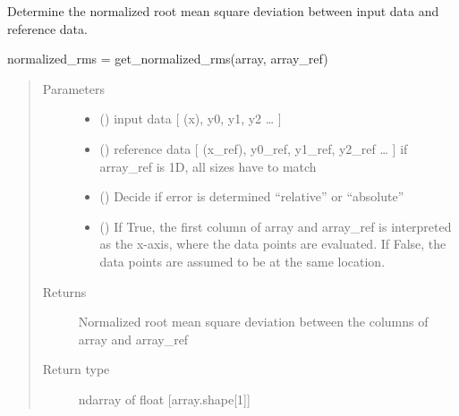 \documentclass[letterpaper,10pt,english,openany,oneside]{sphinxmanual}
\begin{document}
\begin{fulllineitems}
\label{\detokenize{pygpc:pygpc.misc.nrmsd}}
Determine the normalized root mean square deviation between input data and reference data.

normalized\_rms = get\_normalized\_rms(array, array\_ref)
\begin{quote}\begin{description}
\item[{Parameters}] \leavevmode\begin{itemize}
\item {} 
 () \textendash{} input data {[} (x), y0, y1, y2 … {]}

\item {} 
 () \textendash{} reference data {[} (x\_ref), y0\_ref, y1\_ref, y2\_ref … {]}
if array\_ref is 1D, all sizes have to match

\item {} 
 (\sphinxstyleliteralemphasis{\sphinxupquote{, }}\sphinxstyleliteralemphasis{\sphinxupquote{, }}) \textendash{} Decide if error is determined “relative” or “absolute”

\item {} 
 (\sphinxstyleliteralemphasis{\sphinxupquote{, }}\sphinxstyleliteralemphasis{\sphinxupquote{, }}) \textendash{} If True, the first column of array and array\_ref is interpreted as the x-axis, where the data points are
evaluated. If False, the data points are assumed to be at the same location.

\end{itemize}

\item[{Returns}] \leavevmode
{} \textendash{} Normalized root mean square deviation between the columns of array and array\_ref

\item[{Return type}] \leavevmode
ndarray of float {[}array.shape{[}1{]}{]}

\end{description}\end{quote}

\end{fulllineitems}
\end{document}

